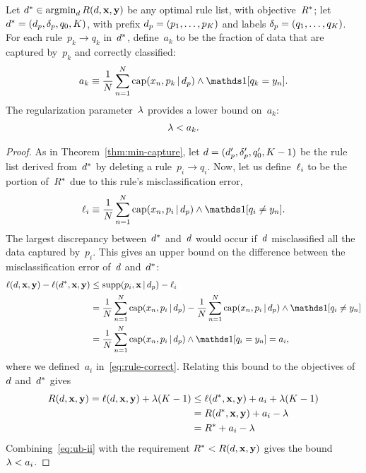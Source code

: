 \begin{theorem}
\label{thm:min-capture-correct}
Let ${d^* \in \operatorname*{argmin}_{d} R({d}, \mathbf{x}, \mathbf{y})}$
be any optimal rule list, with objective~$R^*$;
let ${d^* = (d_p, \delta_p, q_0, K)}$,
with prefix ${d_p = (p_1, \dots, p_K)}$
and labels ${\delta_p = (q_1, \dots, q_K)}$.
%
For each rule~${p_k \rightarrow q_k}$ in~$d^*$,
define~$a_k$ to be the fraction of data that are captured by~$p_k$
and correctly classified:
\begin{align}
a_k \equiv \frac{1}{N} \sum_{n=1}^N
  \Cap(x_n, p_k \given \Prefix) \wedge \one [ q_k = y_n ].
\label{eq:rule-correct}
\end{align}
The regularization parameter~${\lambda}$ provides a lower bound on~$a_k$:
\begin{align}
\Reg < a_k.
\label{eq:min-capture-correct}
\end{align}
\end{theorem}

\begin{arxiv}
\begin{proof}
As in Theorem~\ref{thm:min-capture},
let ${{d} =  (d_p', \delta_p', q_0', K-1)}$ be the rule list
derived from~$d^*$ by deleting a rule~${p_i \rightarrow q_i}$.
%
Now, let us define~$\ell_i$ to be the portion of~$R^*$
due to this rule's misclassification error,
\begin{align}
\Loss_i \equiv \frac{1}{N} \sum_{n=1}^N
  \Cap(x_n, p_i \given \Prefix) \wedge \one [ q_i \neq y_n ].
\end{align}
The largest discrepancy between~$d^*$ and~${d}$ would
occur if~${d}$ misclassified all the data captured by~$p_i$.
%
This gives an upper bound on the difference between
the misclassification error of~${d}$ and~$d^*$:
\begin{align}
\Loss(\RL, \x, \y) - \Loss(\OptimalRL, \x, \y)
&\le \Supp(p_i, \x \given \Prefix) - \Loss_i \nn \\
&= \frac{1}{N} \sum_{n=1}^N \Cap(x_n, p_i \given \Prefix)
  - \frac{1}{N} \sum_{n=1}^N
  \Cap(x_n, p_i \given \Prefix) \wedge \one [ q_i \neq y_n ] \nn \\
&= \frac{1}{N} \sum_{n=1}^N
  \Cap(x_n, p_i \given \Prefix) \wedge \one [ q_i = y_n ] = a_i,
\end{align}
where we defined~$a_i$ in~\eqref{eq:rule-correct}.
%
Relating this bound to the objectives of~${d}$ and~$d^*$ gives
\begin{align}
\Obj(\RL, \x, \y) = \Loss(\RL, \x, \y) + \Reg (K - 1)
&\le \Loss(\OptimalRL, \x, \y) + a_i + \Reg(K - 1) \nn \\
&= \Obj(\OptimalRL, \x, \y) + a_i - \Reg \nn \\
&= \OptimalObj + a_i - \Reg
\label{eq:ub-ii}
\end{align}
Combining~\eqref{eq:ub-ii} with the requirement
${R^* < R({d}, \mathbf{x}, \mathbf{y})}$ gives the bound~${{\lambda} < a_i}$.
\end{proof}
\end{arxiv}

